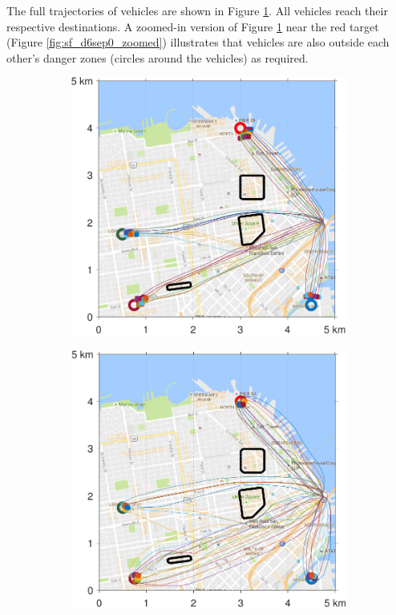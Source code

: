 The full trajectories of vehicles are shown in Figure \ref{fig:sf_d6sep0}. All vehicles reach their respective destinations. A zoomed-in version of Figure \ref{fig:sf_d6sep0} near the red target (Figure \ref{fig:sf_d6sep0_zoomed}) illustrates that vehicles are also outside each other's danger zones (circles around the vehicles) as required. 

\begin{figure}
  \centering
  \begin{subfigure}{0.5\textwidth}
    \includegraphics[width=\columnwidth]{figs/sf_d6sep0}
    \label{fig:sf_d6sep0}
  \end{subfigure}%
  \begin{subfigure}{0.5\textwidth}
    \includegraphics[width=\columnwidth]{figs/sf_d11sep0}
    \label{fig:sf_d11sep0}
  \end{subfigure}
  

\end{figure}
